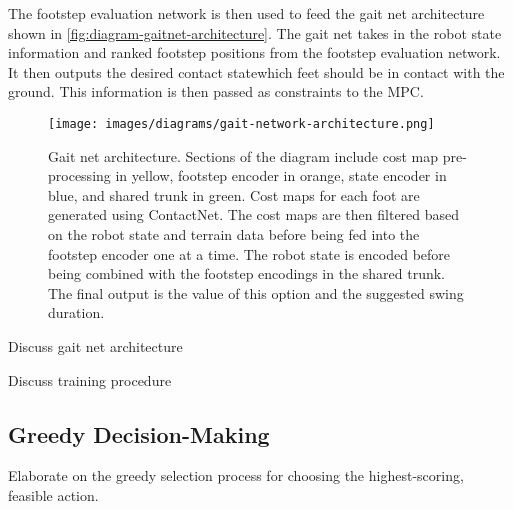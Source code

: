 The footstep evaluation network is then used to feed the gait net
architecture shown in \autoref{fig:diagram-gaitnet-architecture}. The
gait net takes in the robot state information and ranked footstep
positions from the footstep evaluation network. It then outputs the
desired contact state\textemdash which feet should be in contact with
the ground. This information is then passed as constraints to the MPC.

\begin{figure}
  \centering
  \texttt{[image: images/diagrams/gait-network-architecture.png]}
  \caption{Gait net architecture. Sections of the diagram include
    cost map pre-processing in yellow, footstep encoder in orange,
    state encoder in blue, and shared trunk in green. Cost maps for each
    foot are generated using ContactNet. The cost maps are then
    filtered based on the robot state and terrain data before being fed
    into the footstep encoder one at a time. The robot state is encoded
    before being combined with the footstep encodings in the shared
    trunk. The final output is the value of this option and the
  suggested swing duration.}
  \label{fig:diagram-gaitnet-architecture}
\end{figure}

\begin{todo}
  Discuss gait net architecture
\end{todo}

\begin{todo}
  Discuss training procedure
\end{todo}

\subsection{Greedy Decision-Making}

\begin{outline}
  Elaborate on the greedy selection process for choosing the
  highest-scoring, feasible action.
\end{outline}
